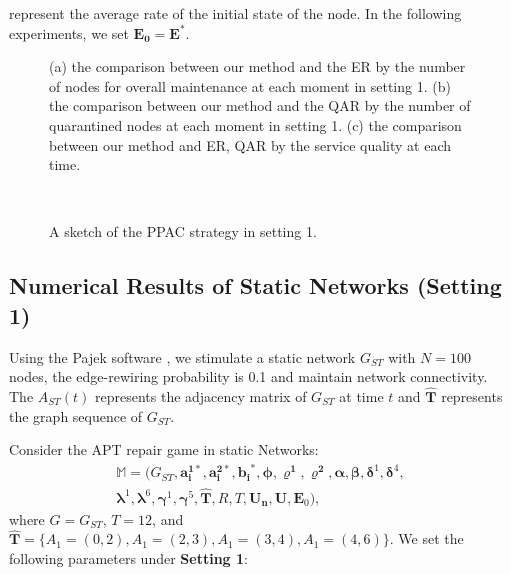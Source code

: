 \documentclass[lettersize,journal]{IEEEtran}
\begin{document}
	represent the average rate of the initial state of the node. In the following experiments, we set $\bm{E_0} = \bm{E}^*$.
  \par
  \begin{figure*}[!t]
\centering
{}
\hfil
{}
\hfil
{}
\hfil
\caption{(a) the comparison between our method and the ER by the number of nodes for overall maintenance at each moment in setting 1. (b) the comparison between our method and the QAR by the number of quarantined nodes at each moment in setting 1. (c) the comparison between our method and ER, QAR by the service quality at each time.}
\label{al}
\end{figure*} 
\begin{figure}[!h]
\centering
{}
\\

\caption{A sketch of the PPAC strategy in setting 1.}
\label{fig_ansofexample3}
\end{figure} 
\subsection{Numerical Results of Static Networks (Setting 1)}\label{static network}
Using the Pajek software \cite{de2018exploratory}, we stimulate a static network $G_{ST}$ with $N = 100$ nodes, the edge-rewiring probability is 0.1 and maintain network connectivity. The $A_{ST}(t)$ represents the adjacency matrix of $G_{ST}$ at time $t$ and $\bm{\hat{T}}$ represents the graph sequence of $G_{ST}$.\par
   Consider the APT repair game in static Networks:
   \begin{equation}
	\begin{aligned}
	\mathbb{M}=(G_{ST},\bm{a^{1*}_i},\bm{a^{2*}_i},\bm{b_i}^*,\bm{\phi},\bm{\varrho^1},\bm{\varrho^2},\bm{\alpha},\bm{\beta},\bm{\delta}^1,\bm{\delta}^4,\\
\bm{\lambda}^1,\bm{\lambda}^6,\bm{\gamma}^1,\bm{\gamma}^5,\bm{\hat{T}},
R,T,\bm{U_n},\bm{U},\bm{E}_0),\nonumber
	\end{aligned}
	\end{equation}
  where $G=G_{ST}$, $T = 12$, and $\bm{\hat{T}}=\{A_1=(0,2),A_1=(2,3),A_1=(3,4),A_1=(4,6)\}$. We set the following parameters under \textbf{Setting 1}:
 
\end{document}
